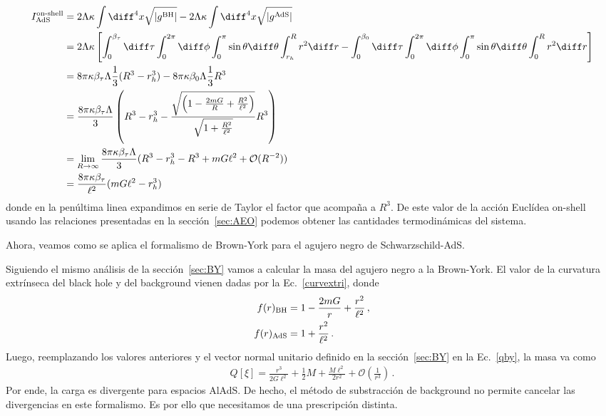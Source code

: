 \documentclass[../Main.tex]{subfiles}
\begin{document}
\begin{align}\notag
I^{\text{on-shell}}_{\text{AdS}}&=2\Lambda\kappa\int \diff^{4}x \sqrt{|g^{\rm BH}|}-2\Lambda\kappa\int \diff^{4}x \sqrt{|g^{\rm AdS}|}\\\notag
&=2\Lambda\kappa\left[\int^{\beta_{\tau}}_{0}\diff\tau\int^{2\pi}_{0}\diff\phi\int^{\pi}_{0}\sin{\theta}\diff\theta\int^{R}_{r_h}r^{2}\diff r-\int^{\beta_0}_{0}\diff\tau\int^{2\pi}_{0}\diff\phi\int^{\pi}_{0}\sin{\theta}\diff\theta\int^{R}_{0}r^{2}\diff r\right]\\\notag
&=8\pi\kappa\beta_{\tau}\Lambda\frac{1}{3}(R^3-r_{h}^3)-8\pi\kappa\beta_{0}\Lambda\frac{1}{3}R^3\\ \notag
&=\frac{8\pi\kappa\beta_{\tau}\Lambda}{3}\left(R^3-r_{h}^3-\frac{\sqrt{\left(1-\frac{2mG}{R}+\frac{R^2}{\ell^2}\right)}}{\sqrt{1+\frac{R^2}{\ell^2}}}R^3\right)\\ \notag
&=\lim_{R \to \infty}\frac{8\pi\kappa\beta_{\tau}\Lambda}{3}(R^3-r_{h}^3-R^3+mG\ell^2+\mathcal{O}(R^{-2}))\\
&=\frac{8\pi\kappa\beta_{\tau}}{\ell^2}(mG\ell^2-r_{h}^3)\, \label{AEOAdS}
\end{align}
donde en la penúltima linea expandimos en serie de Taylor el factor que acompaña a $R^3$. De este valor de la acción Euclídea on-shell usando las relaciones presentadas en la sección~\ref{sec:AEO} podemos obtener las cantidades termodinámicas del sistema. 

Ahora, veamos como se aplica el formalismo de Brown-York para el agujero negro de Schwarzschild-AdS.

Siguiendo el mismo análisis de la sección~\ref{sec:BY} vamos a calcular la masa del agujero negro a la Brown-York. El valor de la curvatura extrínseca del black hole y del background vienen dadas por la Ec.~\eqref{curvextri}, donde
\begin{align}
f(r)_{\rm BH}&=1-\frac{2mG}{r}+\frac{r^2}{\ell^2}\, ,\\
f(r)_{\rm AdS}&=1+\frac{r^2}{\ell^2}\, .
\end{align}
Luego, reemplazando los valores anteriores y el vector normal unitario definido en la sección~\ref{sec:BY} en la Ec.~\eqref{qby}, la masa va como 
\begin{align}
    Q[\xi]=\frac{r^3}{2G\ell^2}+\frac{1}{2}M+\frac{M\ell^2}{2r^2}+\mathcal{O}\left(\frac{1}{r^3}\right)\, .
\end{align}
Por ende, la carga es divergente para espacios AlAdS. De hecho, el método de substracción de background no permite cancelar las divergencias en este formalismo. Es por ello que necesitamos de una prescripción distinta.
\end{document}
